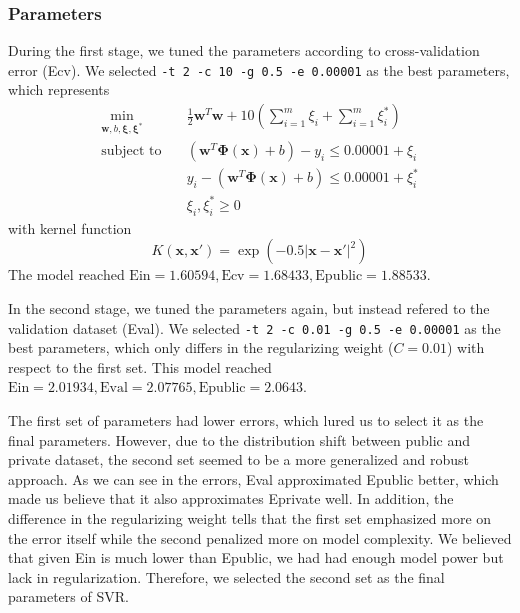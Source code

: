 \documentclass[10pt,letterpaper]{article}
\begin{document}
\subsubsection{Parameters}

During the first stage, we tuned the parameters according to cross-validation error (Ecv). We selected \texttt{-t 2 -c 10 -g 0.5 -e 0.00001} as the best parameters, which represents 
\begin{align*}
	\underset{\mathbf{w}, b, \mathbf{\xi}, \mathbf{\xi^*}}{\min} \quad & \frac{1}{2}\mathbf{w}^T\mathbf{w} + 10\left(\sum_{i=1}^m \xi_i + \sum_{i=1}^m \xi^*_i\right) \\
	\text{subject to} \quad & (\mathbf{w}^T \mathbf{\Phi(x)} + b) - y_i \le 0.00001 + \xi_i \\
	& y_i - (\mathbf{w}^T \mathbf{\Phi(x)} + b) \le 0.00001 + \xi^*_i \\
	& \xi_i, \xi^*_i \ge 0
\end{align*}
with kernel function
$$
	K(\mathbf{x}, \mathbf{x'}) = \exp(-0.5 \lvert \mathbf{x} - \mathbf{x'}\rvert^2)
$$
The model reached $\text{Ein} = 1.60594, \text{Ecv} = 1.68433, \text{Epublic} = 1.88533$. 

In the second stage, we tuned the parameters again, but instead refered to the validation dataset (Eval). We selected \texttt{-t 2 -c 0.01 -g 0.5 -e 0.00001} as the best parameters, which only differs in the regularizing weight ($C = 0.01$) with respect to the first set. This model reached $\text{Ein} = 2.01934, \text{Eval} = 2.07765, \text{Epublic} = 2.0643$. 


The first set of parameters had lower errors, which lured us to select it as the final parameters. However, due to the distribution shift between public and private dataset, the second set seemed to be a more generalized and robust approach. As we can see in the errors, Eval approximated Epublic better, which made us believe that it also approximates Eprivate well. In addition, the difference in the regularizing weight tells that the first set emphasized more on the error itself while the second penalized more on model complexity. We believed that given Ein is much lower than Epublic, we had had enough model power but lack in regularization. Therefore, we selected the second set as the final parameters of SVR. 
\end{document}
